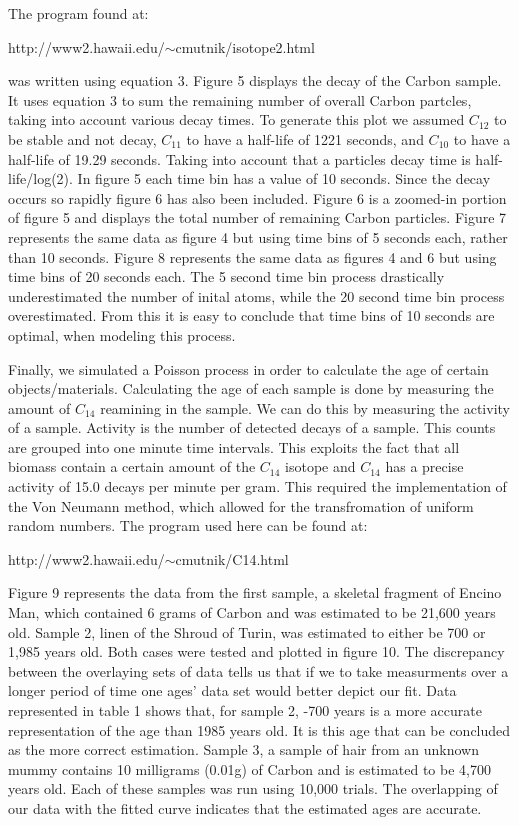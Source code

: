 \documentclass[11pt]{article}
\begin{document}
The program found at:
\begin{center}
http://www2.hawaii.edu/$\sim$cmutnik/isotope2.html
\end{center}
was written using equation 3.  
Figure 5 displays the decay of the Carbon sample.  It uses equation 3 to sum the remaining number of overall Carbon 
partcles, taking into account various decay times.  To generate this plot we assumed $C_{12}$ to be stable and not decay,
$C_{11}$ to have a half-life of 1221 seconds, and $C_{10}$ to have a half-life of 19.29 seconds.  Taking into account that a 
particles decay time is half-life/log(2).  In figure 5 each time bin has a value of 10 seconds.  Since the decay occurs 
so rapidly figure 6 has also been included.  Figure 6 is a zoomed-in portion of figure 5 and displays the total number of 
remaining Carbon particles.  Figure 7 represents the same data as figure 4 but using time bins of 5 seconds each, rather 
than 10 seconds.  Figure 8 represents the same data as figures 4 and 6 but using time bins of 20 seconds each.  The 5 second 
time bin process drastically underestimated the number of inital atoms, while the 20 second time bin process overestimated.  
From this it is easy to conclude that time bins of 10 seconds are optimal, when modeling this process. 



Finally, we simulated a Poisson process in order to calculate the age of certain objects/materials.  Calculating the age 
of each sample is done by measuring the amount of $C_{14}$ reamining in the sample.  We can do this by measuring the activity 
of a sample.  Activity is the number of detected decays of a sample.  This counts are grouped into one minute time intervals.  
This exploits the fact that all biomass contain a certain amount of the $C_{14}$ isotope and $C_{14}$ has a precise activity 
of 15.0 decays per minute per gram.  This required the implementation of the Von Neumann method, which allowed for the 
transfromation of uniform random numbers.
The program used here can be found at:
\begin{center}
http://www2.hawaii.edu/$\sim$cmutnik/C14.html
\end{center}
Figure 9 represents the data from the first sample, a skeletal fragment of Encino Man, which contained 6 grams of 
Carbon and was estimated to be 21,600 years old.  Sample 2, linen of the Shroud of Turin, was estimated to either be 
700 or 1,985 years old.  Both cases were tested and plotted in figure 10.  The discrepancy between the overlaying sets of 
data tells us that if we to take measurments over a longer period of time one ages' data set would better depict our fit.  
Data represented in table 1 shows that, for sample 2, -700 years is a more accurate representation of the age than 1985 years 
old.  It is this age that can be concluded as the more correct estimation.  Sample 3, a sample of hair from an unknown mummy 
contains 10 milligrams (0.01g) of Carbon and is estimated to be 4,700 years old.  Each of these samples was run using 10,000 
trials.  The overlapping of our data with the fitted curve indicates that the estimated ages are accurate.
\end{document}
